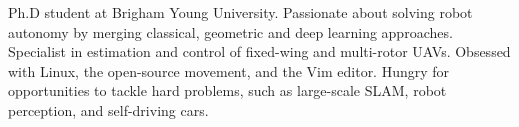 

\begin{cvparagraph}

Ph.D student at Brigham Young University. Passionate about solving robot autonomy by merging classical, geometric and deep learning approaches. Specialist in estimation and control of fixed-wing and multi-rotor UAVs. Obsessed with Linux, the open-source movement, and the Vim editor. Hungry for opportunities to tackle hard problems, such as large-scale SLAM, robot perception, and self-driving cars.
\end{cvparagraph}
